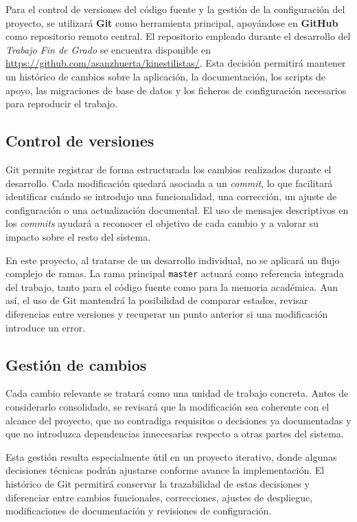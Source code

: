 Para el control de versiones del código fuente y la gestión de la configuración del proyecto, se utilizará \textbf{Git} como herramienta principal, apoyándose en \textbf{GitHub} como repositorio remoto central. El repositorio empleado durante el desarrollo del \textit{Trabajo Fin de Grado} se encuentra disponible en \url{https://github.com/asanzhuerta/kinestilistas/}. Esta decisión permitirá mantener un histórico de cambios sobre la aplicación, la documentación, los scripts de apoyo, las migraciones de base de datos y los ficheros de configuración necesarios para reproducir el trabajo.

\subsection{Control de versiones}

Git permite registrar de forma estructurada los cambios realizados durante el desarrollo. Cada modificación quedará asociada a un \textit{commit}, lo que facilitará identificar cuándo se introdujo una funcionalidad, una corrección, un ajuste de configuración o una actualización documental. El uso de mensajes descriptivos en los \textit{commits} ayudará a reconocer el objetivo de cada cambio y a valorar su impacto sobre el resto del sistema.

En este proyecto, al tratarse de un desarrollo individual, no se aplicará un flujo complejo de ramas. La rama principal \texttt{master} actuará como referencia integrada del trabajo, tanto para el código fuente como para la memoria académica. Aun así, el uso de Git mantendrá la posibilidad de comparar estados, revisar diferencias entre versiones y recuperar un punto anterior si una modificación introduce un error.

\subsection{Gestión de cambios}

Cada cambio relevante se tratará como una unidad de trabajo concreta. Antes de considerarlo consolidado, se revisará que la modificación sea coherente con el alcance del proyecto, que no contradiga requisitos o decisiones ya documentadas y que no introduzca dependencias innecesarias respecto a otras partes del sistema.

Esta gestión resulta especialmente útil en un proyecto iterativo, donde algunas decisiones técnicas podrán ajustarse conforme avance la implementación. El histórico de Git permitirá conservar la trazabilidad de estas decisiones y diferenciar entre cambios funcionales, correcciones, ajustes de despliegue, modificaciones de documentación y revisiones de configuración.


